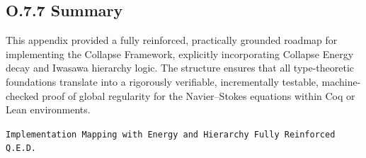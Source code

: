 \documentclass[11pt]{article}
\begin{document}
\subsection*{O.7.7 Summary}

This appendix provided a fully reinforced, practically grounded roadmap for implementing the Collapse Framework, explicitly incorporating Collapse Energy decay and Iwasawa hierarchy logic.  
The structure ensures that all type-theoretic foundations translate into a rigorously verifiable, incrementally testable, machine-checked proof of global regularity for the Navier–Stokes equations within Coq or Lean environments.

\begin{flushright}
\texttt{Implementation Mapping with Energy and Hierarchy Fully Reinforced \quad Q.E.D.}
\end{flushright}
\end{document}
